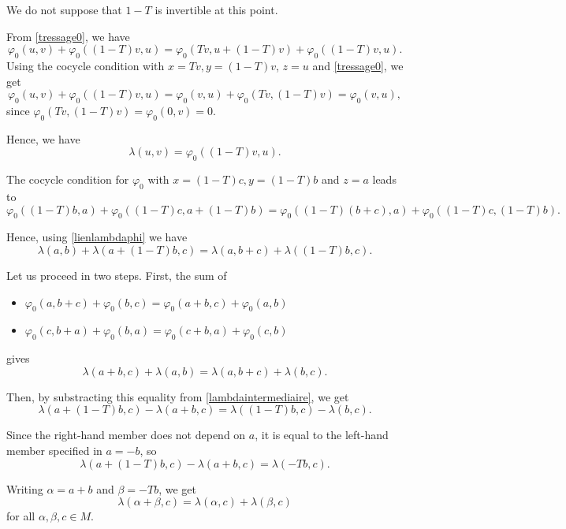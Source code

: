 \documentclass[a4paper,11pt]{amsart}
\theoremstyle{definition}
\begin{document}
We do not suppose that $1-T$ is invertible at this point.

From \cref{tressage0}, we have
\[
\varphi_0(u,v) + \varphi_0((1-T)v,u) = \varphi_0(Tv, u+(1-T) v) + \varphi_0((1-T)v,u).
\]
Using the cocycle condition with $x= Tv, y= (1-T)v$, $z = u$ and \cref{tressage0}, we get
\[
\varphi_0(u,v) + \varphi_0((1-T)v,u) = \varphi_0(v,u) + \varphi_0(Tv, (1-T)v) =  \varphi_0(v,u),
\]
since $\varphi_0(Tv, (1-T)v) = \varphi_0(0,v) = 0$.

Hence, we have
\begin{equation} \label{lienlambdaphi}
\lambda(u,v) = \varphi_0((1-T) v,u).
\end{equation}

The cocycle condition for $\varphi_0$ with $x = (1-T) c, y =(1-T) b$ and $z= a$ leads to
\begin{equation}
\varphi_0((1-T)b, a) + \varphi_0((1-T)c, a + (1-T) b) = \varphi_0 ((1-T) (b+c), a) + \varphi_0 ((1-T) c, (1-T) b).
\end{equation}

Hence, using \eqref{lienlambdaphi} we have
\begin{equation}\label{lambdaintermediaire}
\lambda(a,b) + \lambda(a+ (1-T)b, c) = \lambda(a, b+c) + \lambda((1-T)b, c).
\end{equation}

Let us proceed in two steps.
First, the sum of
\begin{itemize}
\item $\varphi_0(a,b+c) + \varphi_0(b,c) = \varphi_0(a+b,c) + \varphi_0(a,b)$
\item $\varphi_0(c,b+a) + \varphi_0(b,a) = \varphi_0(c+b,a) + \varphi_0(c,b)$
\end{itemize}
gives
\[
\lambda(a+b,c) + \lambda(a,b) = \lambda(a, b+c) + \lambda(b,c).
\]

Then, by substracting this equality from \eqref{lambdaintermediaire}, we get
\begin{equation}
\lambda(a+(1-T)b,c) - \lambda(a+b,c) = \lambda((1-T)b,c) - \lambda(b,c).
\end{equation}

Since the right-hand member does not depend on $a$, it is equal to the left-hand member specified in $a=-b$, so
\[
\lambda(a + (1-T)b,c) - \lambda(a + b,c) = \lambda(-Tb,c) .
\]

Writing $\alpha = a +b$ and $\beta =-Tb$, we get
\[
\lambda(\alpha + \beta,c) = \lambda(\alpha,c) + \lambda(\beta,c)
\]
for all $\alpha,\beta,c\in M$.
\end{document}
